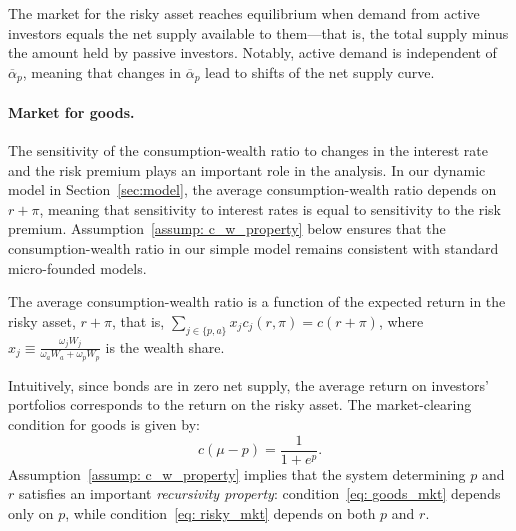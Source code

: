 The market for the risky asset reaches equilibrium when demand from active investors equals the net supply available to them---that is, the total supply minus the amount held by passive investors.
Notably, active demand is independent of $\overline{\alpha}_p$, meaning that changes in $\overline{\alpha}_p$ lead to shifts of the net supply curve. 

\paragraph{Market for goods.} 
The sensitivity of the consumption-wealth ratio to changes in the interest rate and the risk premium plays an important role in the analysis. 
In our dynamic model in Section~\ref{sec:model}, the average consumption-wealth ratio depends on $r+\pi$, meaning that sensitivity to interest rates is equal to sensitivity to the risk premium. 
Assumption~\ref{assump: c_w_property} below ensures that the consumption-wealth ratio in our simple model remains consistent with standard micro-founded models.
\begin{assump}\label{assump: c_w_property}
    The average consumption-wealth ratio is a function of the expected return in the risky asset, $r + \pi$, that is, $\sum_{j\in\{p,a\}} x_j c_j(r,\pi) = c(r+\pi)$, where $x_j \equiv \frac{\omega_j W_j}{\omega_a W_a + \omega_p W_p}$ is the wealth share. 
\end{assump}
Intuitively, since bonds are in zero net supply, the average return on investors’ portfolios corresponds to the return on the risky asset. The market-clearing condition for goods is given by:
\begin{equation}\label{eq: goods_mkt}
    c(\mu-p) = \frac{1}{1+e^p}.
\end{equation}
Assumption~\ref{assump: c_w_property} implies that the system determining $p$ and $r$ satisfies an important \textit{recursivity property}: condition~\eqref{eq: goods_mkt} depends only on $p$, while condition~\eqref{eq: risky_mkt} depends on both $p$ and $r$. 


